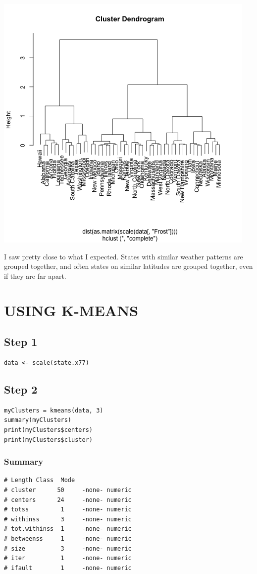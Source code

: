 \documentclass[11pt]{article}
\begin{document}
\begin{center}
\includegraphics[width=.9\linewidth]{hclust-only-frost-with-scale.png}
\end{center}

I saw pretty close to what I expected. States with similar weather patterns are
grouped together, and often states on similar latitudes are grouped together,
even if they are far apart. 
\section*{USING K-MEANS}
\label{sec:orgdcc63b2}
\subsection*{Step 1}
\label{sec:org130f0b9}
\begin{verbatim}
data <- scale(state.x77)
\end{verbatim}
\subsection*{Step 2}
\label{sec:org2c27125}
\begin{verbatim}
myClusters = kmeans(data, 3)
summary(myClusters)
print(myClusters$centers)
print(myClusters$cluster)
\end{verbatim}
\subsubsection*{Summary}
\label{sec:org178039a}
\begin{verbatim}
# Length Class  Mode
# cluster      50     -none- numeric
# centers      24     -none- numeric
# totss         1     -none- numeric
# withinss      3     -none- numeric
# tot.withinss  1     -none- numeric
# betweenss     1     -none- numeric
# size          3     -none- numeric
# iter          1     -none- numeric
# ifault        1     -none- numeric
\end{verbatim}
\end{document}
